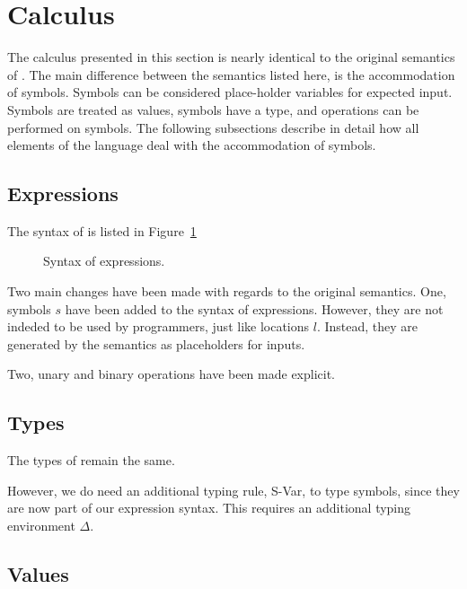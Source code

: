 

\section{Calculus}
\label{sec:language}

The calculus presented in this section is nearly identical to the original semantics of \TOPHAT.
The main difference between the semantics listed here, is the accommodation of symbols.
Symbols can be considered place-holder variables for expected input.
Symbols are treated as values, symbols have a type, and operations can be performed on symbols.
The following subsections describe in detail how all elements of the \TOPHAT language deal with the accommodation of symbols.


\subsection{Expressions}
\label{expressions}

The syntax of \TOPHAT is listed in Figure~\ref{syntaxtophat}

\begin{figure}

\label{syntaxtophat}

\caption{Syntax of \TOPHAT expressions.}
\end{figure}

Two main changes have been made with regards to the original \TOPHAT semantics.
One, symbols $s$ have been added to the syntax of expressions.
However, they are not indeded to be used by programmers, just like locations $l$.
Instead, they are generated by the semantics as placeholders for inputs.

Two, unary and binary operations have been made explicit.

\subsection{Types}

The types of \TOPHAT remain the same.


However, we do need an additional typing rule, S-Var, to type symbols,
since they are now part of our expression syntax.
This requires an additional typing environment $\Delta$.


\subsection{Values}

